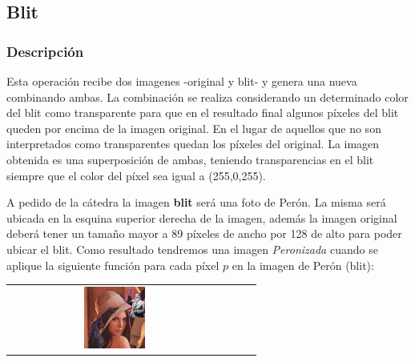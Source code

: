 \subsection{Blit}

\subsubsection{Descripción}

Esta operación recibe dos imagenes -original y blit- y genera una nueva combinando ambas. La combinación se realiza considerando un determinado color del blit como transparente para que en el resultado final algunos píxeles del blit queden por encima de la imagen original. En el lugar de aquellos que no son interpretados como transparentes quedan los píxeles del original. La imagen obtenida es una superposición de ambas, teniendo transparencias en el blit siempre que el color del píxel sea igual a (255,0,255).


\begin{multicols}{2}
A pedido de la cátedra la imagen \textbf{blit} ser\'a una foto de Per\'on. La misma será ubicada en la esquina superior derecha de la imagen, además la imagen original deberá tener un tamaño mayor a 89 píxeles de ancho por 128 de alto para poder ubicar el blit. Como resultado tendremos una imagen \textit{Peronizada} cuando se aplique la siguiente función para cada p\'ixel $p$ en la imagen de Per\'on (blit):\\
\begin{center}
	\begin{tabular}{cccc}
	  \includegraphics[width=0.3\textwidth]{imagenes/lenaBLIT.jpg} \\
	\end{tabular}
   \end{center}
\end{multicols}

